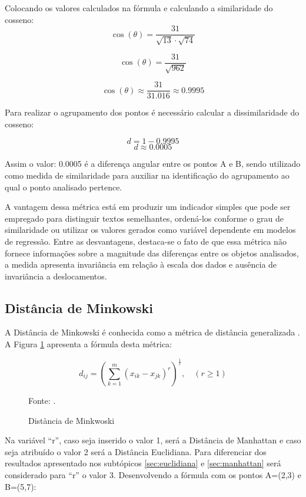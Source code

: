 \documentclass[10pt,a4paper,twocolumn]{article}
\begin{document}
Colocando os valores calculados na fórmula e calculando a similaridade do cosseno:
\[
\cos(\theta) =
\frac{31}{\sqrt{13} \cdot \sqrt{74}}
\]

\[
\cos(\theta) =
\frac{31}{\sqrt{962}}
\]

\[
\cos(\theta) \approx
\frac{31}{31.016}
\approx 0.9995
\] 

Para realizar o agrupamento dos pontos é necessário calcular a dissimilaridade do cosseno:

\[
d = 1 - 0.9995
\]
\[
d \approx 0.0005
\] 

Assim o valor: 0.0005 é a diferença angular entre os pontos A e B, sendo utilizado como medida de similaridade para auxiliar na identificação do agrupamento ao qual o ponto analisado pertence.

A vantagem dessa métrica está em produzir um indicador simples que pode ser empregado para distinguir textos semelhantes, ordená-los conforme o grau de similaridade ou utilizar os valores gerados como variável dependente em modelos de regressão. Entre as desvantagens, destaca-se o fato de que essa métrica não fornece informações sobre a magnitude das diferenças entre os objetos analisados, a medida apresenta invariância em relação à escala dos dados e ausência de invariância a deslocamentos\cite{VelezFalconi2020}.

\subsection{Distância de Minkowski} %
\label{sec:minkowski}

A Distância de Minkowski é conhecida como a métrica de distância generalizada \cite{AlKhamees2026}. A Figura \ref{fig:minkwoski} apresenta a fórmula desta métrica:
\begin{figure}[h!]
   \centering
      \[
         d_{ij} = \left( \sum_{k=1}^{m} \left( x_{ik} - x_{jk} \right)^r \right)^{\frac{1}{r}}, \quad (r \geq 1)
      \]
      \vspace{-0.7cm}
      \caption{Distància de Minkwoski}
       \label{fig:minkwoski}
       \vspace{0.0cm}
       {\small Fonte: \cite{Ferrari2016}.}     
\end{figure}

Na variável “r”, caso seja inserido o valor 1, será a Distância de Manhattan e caso seja atribuído o valor 2 será a Distância Euclidiana. Para diferenciar dos resultados apresentado nos subtópicos \ref{sec:euclidiana} e \ref{sec:manhattan} será considerado para “r” o valor 3. Desenvolvendo a fórmula com os pontos A=(2,3) e B=(5,7):
\end{document}
